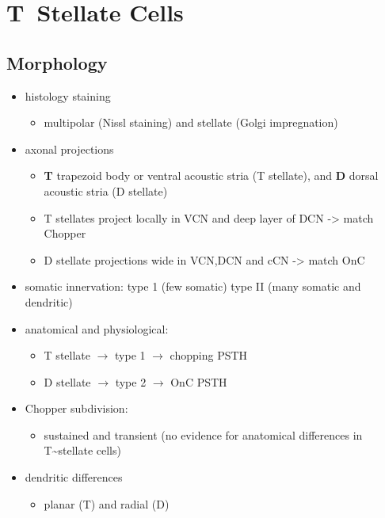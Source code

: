 

\section{T~Stellate Cells}


\subsection{Morphology}
\label{sec:backgrTS}


\begin{itemize}
\item histology staining
\begin{itemize}
\item multipolar (Nissl staining) and stellate (Golgi impregnation) \citep{Osen:1969,BrawerMorestEtAl:1974,Lorente:1981}
\end{itemize}
\item axonal projections
\begin{itemize}
\item \textbf{T} trapezoid body or ventral acoustic stria (T stellate), and \textbf{D} dorsal acoustic stria (D stellate) \citep{OertelWuEtAl:1990}
\item T stellates project locally in VCN and deep layer of DCN -> match Chopper \citep{RhodeOertelEtAl:1983,SmithRhode:1989}
\item D stellate projections wide in VCN,DCN and cCN -> match OnC  \citep{SmithRhode:1989}
\end{itemize}
\item somatic innervation: type 1 (few somatic) type II (many somatic and dendritic) \citep{Cant:1981}
\item anatomical and physiological: \citet{SmithRhode:1989}
\begin{itemize}
\item T stellate $\rightarrow$ type 1 $\rightarrow$ chopping PSTH
\item D stellate $\rightarrow$ type 2 $\rightarrow$ OnC PSTH
\end{itemize}
\item Chopper subdivision:
\begin{itemize}
\item sustained and transient (no evidence for anatomical differences in T\~{}stellate cells)
\end{itemize}
\item dendritic differences \citep{DoucetRyugo:1997,DoucetRyugo:2006}
\begin{itemize}
\item planar (T) and radial (D)
\end{itemize}
\end{itemize}

